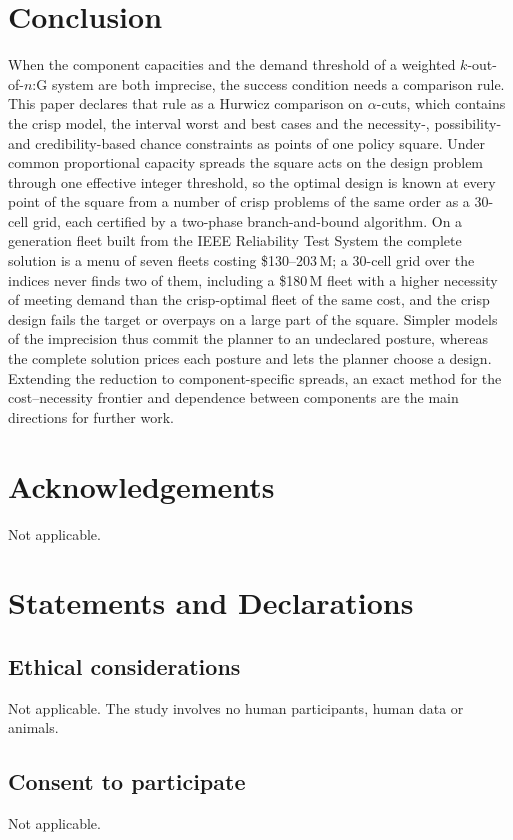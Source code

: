 \documentclass[Review,sagev,times]{sagej}%
\begin{document}
\section{Conclusion} \label{sec:conclusion}
When the component capacities and the demand threshold of a weighted $k$-out-of-$n$:G system are both imprecise,
the success condition needs a comparison rule. This paper declares that rule as a Hurwicz comparison on
$\alpha$-cuts, which contains the crisp model, the interval worst and best cases and the necessity-, possibility-
and credibility-based chance constraints as points of one policy square. Under common proportional capacity
spreads the square acts on the design problem through one effective integer threshold, so the optimal design is
known at every point of the square from a number of crisp problems of the same order as a $30$-cell grid, each certified by a two-phase
branch-and-bound algorithm. On a generation fleet built from the IEEE Reliability Test System the complete
solution is a menu of seven fleets costing \$130--203\,M; a $30$-cell grid over the indices never finds two of them, including a
\$180\,M fleet with a higher necessity of meeting demand than the crisp-optimal fleet of the same cost, and the
crisp design fails the target or overpays on a large part of the square. Simpler models of the imprecision
thus commit the planner to an undeclared posture, whereas the complete solution prices each posture and lets the
planner choose a design. Extending the reduction to component-specific spreads, an exact method for the
cost--necessity frontier and dependence between components are the main directions for further work.

\section*{Acknowledgements}
Not applicable.

\section*{Statements and Declarations}

\subsection*{Ethical considerations}
Not applicable. The study involves no human participants, human data or animals.

\subsection*{Consent to participate}
Not applicable.
\end{document}
